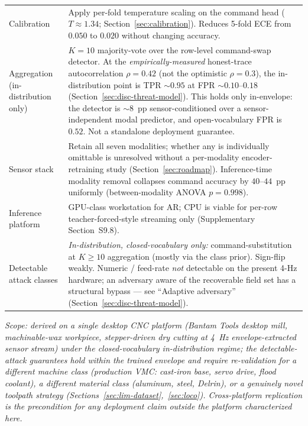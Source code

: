 \documentclass[sensors,article,submit,moreauthors,pdftex]{Definitions/mdpi}
\begin{document}
\begin{center}
\begin{tabular}{p{} p{}}
Calibration & Apply per-fold temperature scaling on the command head ($T \approx 1.34$; Section~\ref{sec:calibration}). Reduces 5-fold ECE from $0.050$ to $0.020$ without changing accuracy. \\
Aggregation (in-distribution only) & $K=10$ majority-vote over the row-level command-swap detector. At the \emph{empirically-measured} honest-trace autocorrelation $\rho=0.42$ (not the optimistic $\rho=0.3$), the in-distribution point is TPR $\sim 0.95$ at FPR $\sim 0.10$--$0.18$ (Section~\ref{sec:disc-threat-model}). This holds only in-envelope: the detector is $\sim$8~pp sensor-conditioned over a sensor-independent modal predictor, and open-vocabulary FPR is $0.52$. Not a standalone deployment guarantee. \\
Sensor stack & Retain all seven modalities; whether any is individually omittable is unresolved without a per-modality encoder-retraining study (Section~\ref{sec:roadmap}). Inference-time modality removal collapses command accuracy by $40$--$44$~pp uniformly (between-modality ANOVA $p=0.998$). \\
Inference platform & GPU-class workstation for AR; CPU is viable for per-row teacher-forced-style streaming only (Supplementary Section~S9.8). \\
Detectable attack classes & \emph{In-distribution, closed-vocabulary only:} command-substitution at $K \ge 10$ aggregation (mostly via the class prior). Sign-flip weakly. Numeric / feed-rate \emph{not} detectable on the present 4-Hz hardware; an adversary aware of the recoverable field set has a structural bypass --- see ``Adaptive adversary'' (Section~\ref{sec:disc-threat-model}). \\
\bottomrule
\end{tabular}
\end{center}
\noindent\footnotesize\textit{Scope: derived on a single desktop CNC platform (Bantam Tools desktop mill, machinable-wax workpiece, stepper-driven dry cutting at 4~Hz envelope-extracted sensor stream) under the closed-vocabulary in-distribution regime; the detectable-attack guarantees hold within the trained envelope and require re-validation for a different machine class (production VMC: cast-iron base, servo drive, flood coolant), a different material class (aluminum, steel, Delrin), or a genuinely novel toolpath strategy (Sections~\ref{sec:lim-dataset},~\ref{sec:loco}). Cross-platform replication is the precondition for any deployment claim outside the platform characterized here.}\normalsize
\end{document}
